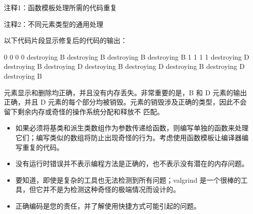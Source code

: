 {\footnotesize
注释1：函数模板处理所需的代码重复

注释2：不同元素类型的通用处理
}

以下代码片段显示修复后的代码的输出：

\begin{shell}
0
0
0
0
destroying B
destroying B
destroying B
destroying B
1
1
1
1
destroying D
destroying B
destroying D
destroying B
destroying D
destroying B
destroying D
destroying B
\end{shell}

元素显示和删除均正确，并且没有内存丢失。非常重要的是，B 和 D 元素的输出正确，并且 D 元素的每个部分均被销毁。元素的销毁涉及正确的类型，因此不会留下剩余内存或奇怪的操作系统分配和释放不 匹配。


\begin{itemize}
\item
如果必须将基类和派生类数组作为参数传递给函数，则编写单独的函数来处理它们；编写类似的数组将防止出现奇怪的行为。考虑使用函数模板让编译器编写重复的代码。

\item
没有运行时错误并不表示编程方法是正确的，也不表示没有潜在的内存问题。

\item
要知道，即使是复杂的工具也无法检测到所有问题；valgrind 是一个很棒的工具，但它并不是为检测这种奇怪的极端情况而设计的。

\item
正确编码是您的责任，并了解使用快捷方式可能引起的问题。
\end{itemize}












